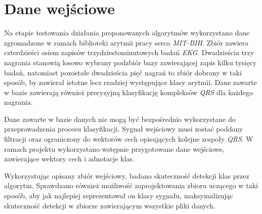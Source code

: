 \section{Dane wejściowe}
Na etapie testowania działania proponowanych algorytmów wykorzystano dane zgromadzone w ramach biblioteki arytmii pracy serca \textit{MIT-BIH}. Zbiór zawiera czterdzieści osiem zapisów trzydziestominutowych badań \textit{EKG}. Dwadzieścia trzy nagrania stanowią losowo wybrany podzbiór bazy zawierającej zapis kilku tysięcy badań, natomiast pozostałe dwadzieścia pięć nagrań to zbiór dobrany w taki sposób, by zawierał istotne lecz rzadziej występujące klasy arytmii. Dane zawarte w bazie zawierają również precyzyjną klasyfikację kompleksów \textit{QRS} dla każdego nagrania.

Dane zawarte w bazie danych nie mogą być bezpośrednio wykorzystane do przeprowadzenia procesu klasyfikacji. Sygnał wejściowy musi zostać poddany filtracji oraz ograniczony do wektorów cech opisujących kolejne zespoły \textit{QRS}. W ramach projektu wykorzystano wstępnie przygotowane dane wejściowe, zawierające wektory cech i adnotacje klas.

Wykorzystując opisany zbiór wejściowy, badano skuteczność detekcji klas przez algorytm. Sprawdzano również możliwość zaprojektowania zbioru uczącego w taki sposób, aby jak najlepiej reprezentował on klasy sygnału, maksymalizując skuteczność detekcji w zbiorze zawierającym wszystkie pliki danych.